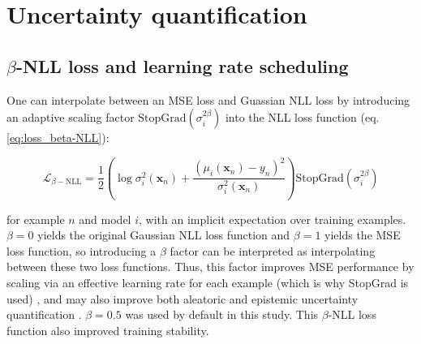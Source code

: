  

\section{Uncertainty quantification}
\label{sec:uncertainty}

\subsection{$\beta$-NLL loss and learning rate scheduling}

One can interpolate between an MSE loss and Guassian NLL loss by introducing an adaptive scaling factor $\text{StopGrad}(\sigma_i^{2\beta})$ into the NLL loss function (eq. \ref{eq:loss_beta-NLL}):

\begin{equation}
	\mathcal{L}_{\beta-\text{NLL}} = \frac{1}{2}\left( \log{\sigma^2_i(\mathbf{x}_n)} +\frac{\left(\mu_i(\mathbf{x}_n) - y_n\right)^2}{\sigma^2_i (\mathbf{x}_n)} \right) \text{StopGrad}\left(\sigma_i^{2\beta}\right)
	\label{eq:loss_beta-NLL}
\end{equation}

for example $n$ and model $i$, with an implicit expectation over training examples. $\beta=0$ yields the original Gaussian NLL loss function and $\beta=1$ yields the MSE loss function, so introducing a $\beta$ factor can be interpreted as interpolating between these two loss functions. Thus, this factor improves MSE performance by scaling via an effective learning rate for each example (which is why StopGrad is used) \cite{seitzer_pitfalls_2022}, and may also improve both aleatoric and epistemic uncertainty quantification \cite{valdenegro-toro_deeper_2022}. $\beta=0.5$ was used by default in this study. This $\beta$-NLL loss function also improved training stability.

